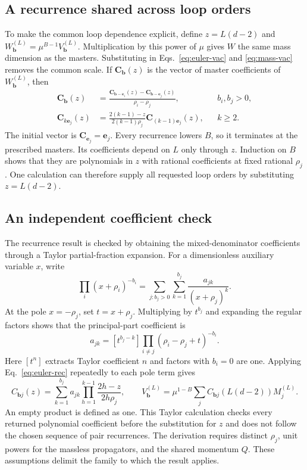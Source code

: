 \subsection{A recurrence shared across loop orders}
To make the common loop dependence explicit, define $z=L(d-2)$ and $W_{\boldsymbol b}^{(L)}=\mu^{B-1}V_{\boldsymbol b}^{(L)}$. Multiplication by this power of $\mu$ gives $W$ the same mass dimension as the masters. Substituting in Eqs.~\eqref{eq:euler-vac} and \eqref{eq:mass-vac} removes the common scale. If $\boldsymbol C_{\boldsymbol b}(z)$ is the vector of master coefficients of $W_{\boldsymbol b}^{(L)}$, then
\begin{align}
 \boldsymbol C_{\boldsymbol b}(z)
 &=\frac{\boldsymbol C_{\boldsymbol b-\boldsymbol e_i}(z)
          -\boldsymbol C_{\boldsymbol b-\boldsymbol e_j}(z)}{\rho_i-\rho_j},
       &&b_i,b_j>0,\label{eq:mass-rec}\\
 \boldsymbol C_{k\boldsymbol e_j}(z)
 &=\frac{2(k-1)-z}{2(k-1)\rho_j}
         \boldsymbol C_{(k-1)\boldsymbol e_j}(z),
       &&k\geq2.\label{eq:euler-rec}
\end{align}
The initial vector is $\boldsymbol C_{\boldsymbol e_j}=\boldsymbol e_j$. Every recurrence lowers $B$, so it terminates at the prescribed masters. Its coefficients depend on $L$ only through $z$. Induction on $B$ shows that they are polynomials in $z$ with rational coefficients at fixed rational $\rho_j$. One calculation can therefore supply all requested loop orders by substituting $z=L(d-2)$.

\subsection{An independent coefficient check}
The recurrence result is checked by obtaining the mixed-denominator coefficients through a Taylor partial-fraction expansion. For a dimensionless auxiliary variable $x$, write
\begin{equation}
 \prod_i(x+\rho_i)^{-b_i}
   =\sum_{j:b_j>0}\sum_{k=1}^{b_j}\frac{a_{jk}}{(x+\rho_j)^k}.
\end{equation}
At the pole $x=-\rho_j$, set $t=x+\rho_j$. Multiplying by $t^{b_j}$ and expanding the regular factors shows that the principal-part coefficient is
\begin{equation}
 a_{jk}=[t^{b_j-k}]\prod_{i\ne j}(\rho_i-\rho_j+t)^{-b_i}.
 \label{eq:taylor}
\end{equation}
Here $[t^n]$ extracts Taylor coefficient $n$ and factors with $b_i=0$ are one. Applying Eq.~\eqref{eq:euler-rec} repeatedly to each pole term gives
\begin{equation}
 C_{\boldsymbol b j}(z)=\sum_{k=1}^{b_j}a_{jk}
       \prod_{h=1}^{k-1}\frac{2h-z}{2h\rho_j},
 \qquad
 V^{(L)}_{\boldsymbol b}
 =\mu^{1-B}\sum_j C_{\boldsymbol b j}(L(d-2))M_j^{(L)}.
 \label{eq:checked-vacuum}
\end{equation}
An empty product is defined as one. This Taylor calculation checks every returned polynomial coefficient before the substitution for $z$ and does not follow the chosen sequence of pair recurrences. The derivation requires distinct $\rho_j$, unit powers for the massless propagators, and the shared momentum $Q$. These assumptions delimit the family to which the result applies.

